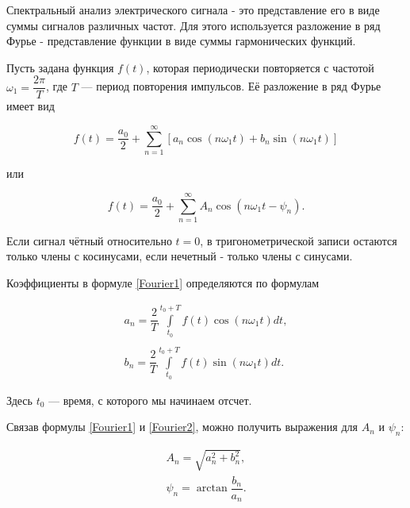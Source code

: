 \documentclass[a4paper,12pt]{article} %
\begin{document}
\par Спектральный анализ электрического сигнала - это представление его в виде суммы сигналов различных частот. Для этого используется разложение в ряд Фурье - представление функции в виде суммы гармонических функций.

Пусть задана функция $f(t)$, которая периодически повторяется с частотой $\omega_1 = \dfrac{2\pi}{T}$, где $T$ --- период повторения импульсов. Её разложение в ряд Фурье имеет вид 

\begin{equation}
    f(t) = \dfrac{a_0}{2} + \sum\limits_{n = 1}^{\infty}\left[a_n \cos \left(n \omega_1t\right) + b_n \sin \left(n \omega_1t\right)\right]
    \label{Fourier1}
\end{equation}

или

\begin{equation}
    f(t) = \dfrac{a_0}{2} + \sum\limits_{n = 1}^{\infty}A_n \cos \left(n\omega_1 t - \psi_n\right).
    \label{Fourier2}
\end{equation}

Если сигнал чётный относительно $t = 0$, в тригонометрической записи остаются только члены с косинусами, если нечетный - только члены с синусами.

Коэффициенты в формуле \eqref{Fourier1} определяются по формулам

\begin{equation}
\begin{array}{c}
    a_n = \dfrac{2}{T} \int\limits_{t_0}^{t_0 + T} f(t) \cos\left(n \omega_1 t\right) dt,\\
    \\
    b_n = \dfrac{2}{T} \int\limits_{t_0}^{t_0 + T} f(t) \sin\left(n \omega_1 t\right) dt.
\end{array}
\label{FourierKoeffs}
\end{equation}

Здесь $t_0$ --- время, с которого мы начинаем отсчет.

Связав формулы \eqref{Fourier1} и \eqref{Fourier2}, можно получить выражения для $A_n$  и $\psi_n$:

\begin{equation}
\begin{array}{l}
    A_n = \sqrt{a_n^2+b_n^2},\\
    \psi_n = \arctan \dfrac{b_n}{a_n}.
\end{array}
\end{equation}
\end{document}
